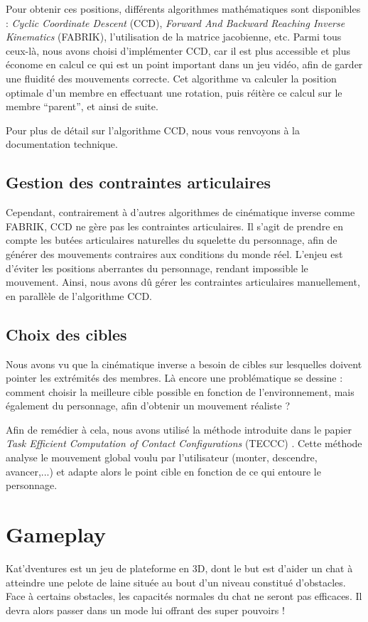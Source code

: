 \documentclass[a4paper,11pt]{article}
\begin{document}
Pour obtenir ces positions, différents algorithmes mathématiques sont disponibles : \textit{Cyclic Coordinate Descent} (CCD), \textit{Forward And Backward Reaching Inverse Kinematics} (FABRIK), l'utilisation de la matrice jacobienne, etc. Parmi tous ceux-là, nous avons choisi d'implémenter CCD, car il est plus accessible et plus économe en calcul ce qui est un point important dans un jeu vidéo, afin de garder une fluidité des mouvements correcte. Cet algorithme va calculer la position optimale d'un membre en effectuant une rotation, puis réitère ce calcul sur le membre ``parent'', et ainsi de suite.

Pour plus de détail sur l'algorithme CCD, nous vous renvoyons à la documentation technique.



\subsection{Gestion des contraintes articulaires}
Cependant, contrairement à d'autres algorithmes de cinématique inverse comme FABRIK, CCD ne gère pas les contraintes articulaires. Il s'agit de prendre en compte les butées articulaires naturelles du squelette du personnage, afin de générer des mouvements contraires aux conditions du monde réel. L'enjeu est d'éviter les positions aberrantes du personnage, rendant impossible le mouvement. Ainsi, nous avons dû gérer les contraintes articulaires manuellement, en parallèle de l'algorithme CCD.

\subsection{Choix des cibles}
Nous avons vu que la cinématique inverse a besoin de cibles sur lesquelles doivent pointer les extrémités des membres. Là encore une problématique se dessine : comment choisir la meilleure cible possible en fonction de l'environnement, mais également du personnage, afin d'obtenir un mouvement réaliste ?

Afin de remédier à cela, nous avons utilisé la méthode introduite dans le papier \textit{Task Efficient Computation of Contact Configurations}  (TECCC) \cite{tonneau:latex:14}. Cette méthode analyse le mouvement global voulu par l'utilisateur (monter, descendre, avancer,...) et adapte alors le point cible en fonction de ce qui entoure le personnage. 


\section{Gameplay}
Kat'dventures est un jeu de plateforme en 3D, dont le but est d'aider un chat à atteindre une pelote de laine située au bout d'un niveau constitué d'obstacles. Face à certains obstacles, les capacités normales du chat ne seront pas efficaces. Il devra alors passer dans un mode lui offrant des super pouvoirs !
\end{document}
